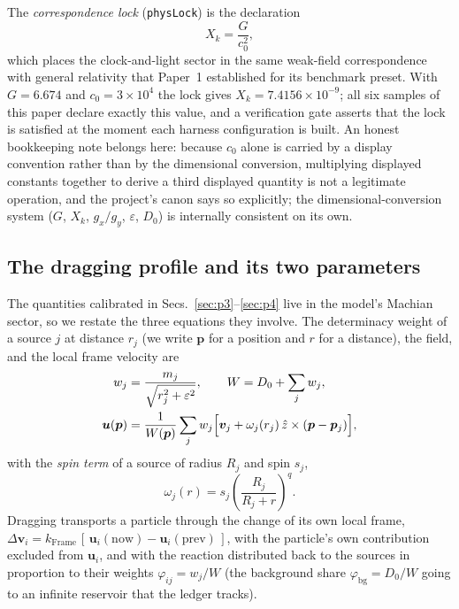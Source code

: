 \documentclass[aps,reprint,amsmath,amssymb,nofootinbib,superscriptaddress,floatfix]{revtex4-2}
\begin{document}
The \emph{correspondence lock} (\texttt{physLock}) is the declaration
\begin{equation}
  X_k = \frac{G}{c_0^{2}} ,
  \label{eq:lock}
\end{equation}
which places the clock-and-light sector in the same weak-field
correspondence with general relativity that Paper~1 established for
its benchmark preset.
With $G=6.674$ and $c_0=3\times10^{4}$ the lock gives
$X_k=7.4156\times10^{-9}$;
all six samples of this paper declare exactly this value, and a
verification gate asserts that the lock is satisfied at the moment
each harness configuration is built.
An honest bookkeeping note belongs here: because $c_0$ alone is carried
by a display convention rather than by the dimensional conversion,
multiplying displayed constants together to derive a third displayed
quantity is not a legitimate operation, and the project's canon says
so explicitly; the dimensional-conversion system
($G$, $X_k$, $g_x/g_y$, $\varepsilon$, $D_0$) is internally
consistent on its own.

\subsection{The dragging profile and its two parameters}
\label{sec:profile}

The quantities calibrated in Secs.~\ref{sec:p3}--\ref{sec:p4} live in
the model's Machian sector, so we restate the three equations they
involve.
The determinacy weight of a source $j$ at distance $r_j$ (we write $\bm p$
for a position and $r$ for a distance), the field,
and the local frame velocity are
\begin{align}
  w_j &= \frac{m_j}{\sqrt{r_j^{2}+\varepsilon^{2}}},
  \qquad W = D_0+\sum_j w_j,
  \label{eq:W}\\
  \bm u(\bm p) &= \frac{1}{W(\bm p)}\sum_j w_j
   \Bigl[\bm v_j+\omega_j(r_j)\,\hat z\times(\bm p-\bm p_j)\Bigr],
  \label{eq:u}
\end{align}
with the \emph{spin term} of a source of radius $R_j$ and spin $s_j$,
\begin{equation}
  \omega_j(r) = s_j\left(\frac{R_j}{R_j+r}\right)^{q}.
  \label{eq:spinterm}
\end{equation}
Dragging transports a particle through the change of its own local
frame, $\Delta\bm v_i = k_{\mathrm{Frame}}\,[\,\bm u_i(\text{now})-
\bm u_i(\text{prev})\,]$, with the particle's own contribution
excluded from $\bm u_i$, and with the reaction distributed back to the
sources in proportion to their weights $\varphi_{ij}=w_j/W$ (the
background share $\varphi_{\mathrm{bg}}=D_0/W$ going to an infinite
reservoir that the ledger tracks).
\end{document}
